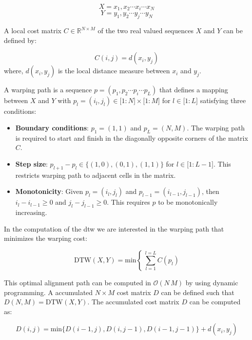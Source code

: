 \begin{equation}
	X = x_1, x_2 \cdots x_i \cdots x_N
\end{equation}
\begin{equation}
	Y = y_1, y_2 \cdots y_j \cdots y_N
\end{equation}

\noindent A local cost matrix $C \in \mathbb{R}^{N \times M}$ of the two real valued sequences $X$ and $Y$ can be defined by:

\begin{equation}
C(i,j) = d(x_i,y_j)
\end{equation}
\noindent where, $d(x_i,y_j)$ is the local distance measure between $x_i$ and $y_j$.

A warping path is a sequence $p = (p_1, p_2 \cdots p_i \cdots p_L)$ that defines a mapping between $X$ and $Y$ with $p_l = (i_l, j_l) \in \lbrack 1:N\rbrack \times \lbrack1:M\rbrack$ for $ l \in \lbrack1:L\rbrack$ satisfying three conditions:

\begin{itemize}
	\item \textbf{Boundary conditions}: $p_1 = (1, 1)$ and $p_L = (N, M)$. The warping path is required to start and finish in the diagonally opposite corners of the matrix $C$.
	\item \textbf{Step size}: $p_{l+1}-p_l \in \lbrace (1,0), (0,1), (1,1) \rbrace$ for $l \in \lbrack 1: L-1 \rbrack$. This restricts warping path to adjacent cells in the matrix.
	\item \textbf{Monotonicity}: Given $p_l = (i_l, j_l)$ and $p_{l-1} = (i_{l-1}, j_{l-1})$, then $i_l - i_{l-1} \geq 0$ and $j_l - j_{l-1} \geq 0$. This requires $p$ to be monotonically increasing.
\end{itemize}

In the computation of the \gls{dtw} we are interested in the warping path that minimizes the warping cost:

\begin{equation}
\mathrm{DTW}(X,Y) = \mathrm{min} \left\lbrace ~\sum_{l=1}^{l=L}C(p_l)\right.
\end{equation}

This optimal alignment path can be computed in $\mathcal{O}(N\,M)$ by using dynamic programming. A accumulated  $N \times M$ cost matrix $D$ can be defined such that $D(N,M) = \mathrm{DTW}(X,Y)$. The accumulated cost matrix $D$ can be computed as:

\begin{equation}
\label{eq:dtw_classic_cost_matrix_computation}
	D(i,j) = \mathrm{min} \lbrace D(i-1,j), D(i,j-1), D(i-1,j-1)\rbrace + d(x_i, y_j)
\end{equation}


